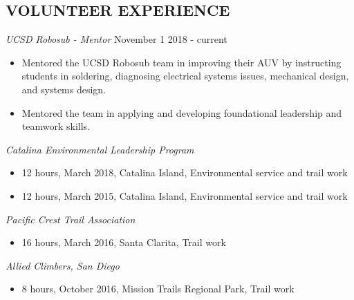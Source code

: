 \documentclass[line,margin]{res}
\begin{document}
\begin{resume}
\section{VOLUNTEER EXPERIENCE}
	{\sl UCSD Robosub - Mentor} \hfill November 1 2018 - current
		\begin{itemize}
			\item Mentored the UCSD Robosub team in improving their AUV by instructing students in soldering, diagnosing electrical systems issues, mechanical design, and systems design.
			\item Mentored the team in applying and developing foundational leadership and teamwork skills.
		\end{itemize}
	{\sl Catalina Environmental Leadership Program}
		\begin{itemize}
			\item 12 hours, March 2018, Catalina Island, Environmental service and trail work
			\item 12 hours, March 2015, Catalina Island, Environmental service and trail work
		\end{itemize}

	{\sl Pacific Crest Trail Association}
		\begin{itemize}
			\item 16 hours, March 2016, Santa Clarita, Trail work
		\end{itemize}

	{\sl Allied Climbers, San Diego}
		\begin{itemize}
			\item 8 hours, October 2016, Mission Trails Regional Park, Trail work
		\end{itemize}


\end{resume}
\end{document}
